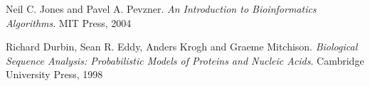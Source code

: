 \documentclass[10pt]{article} %
\theoremstyle{problemstyle}
\begin{document}
\begin{thebibliography}{3}
	
	Neil C. Jones and Pavel A. Pevzner. 
	\textit{An Introduction to Bioinformatics Algorithms}. 
	MIT Press, 2004
	
	Richard Durbin, Sean R. Eddy, Anders Krogh and Graeme Mitchison. 
	\textit{Biological Sequence Analysis: Probabilistic Models of Proteins and Nucleic Acids}. 
	Cambridge University Press, 1998
	
\end{thebibliography}
\end{document}
